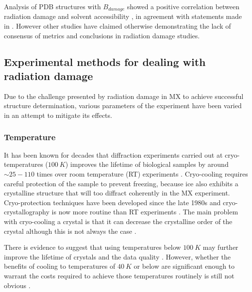         Analysis of PDB structures with $B_{damage}$ showed a positive correlation between radiation damage and solvent accessibility \cite{gerstel2015identifying}, in agreement with statements made in \cite{sygusch1988}. 
		However other studies have claimed otherwise \cite{coquelle2007activity,homer2011energy} demonstrating the lack of consensus of metrics and conclusions in radiation damage studies.

    \subsection{Experimental methods for dealing with radiation damage}
    \label{sub:Experimental methods for dealing with radiation damage}
        Due to the challenge presented by radiation damage in MX to achieve successful structure determination, various parameters of the experiment have been varied in an attempt to mitigate its effects.

        \subsubsection{Temperature}
        \label{subs:Temperature}
            It has been known for decades that diffraction experiments carried out at cryo-temperatures ($100\ K$) improves the lifetime of biological samples \cite{henderson1990cryo,brooks2015nobel} by around $\sim 25 - 110$ times over room temperature (RT) experiments \cite{south2007}.
            Cryo-cooling requires careful protection of the sample to prevent freezing, because ice also exhibits a crystalline structure that will too diffract coherently in the MX experiment.
            Cryo-protection techniques have been developed since the late 1980s \cite{garman1997macromolecular,hope1988cryocrystallography,teng1990mounting} and cryo-crystallography is now more routine than RT experiments \cite{garman2014}.
            The main problem with cryo-cooling a crystal is that it can decrease the crystalline order of the crystal \cite{nave2005} although this is not always the case \cite{garman1999cool}.

            There is evidence to suggest that using temperatures below $100\ K$ may further improve the lifetime of crystals and the data quality \cite{meents2010,teng2002}.
            However, whether the benefits of cooling to temperatures of $40\ K$ or below are significant enough to warrant the costs required to achieve those temperatures routinely is still not obvious \cite{weik2010temperature}.

